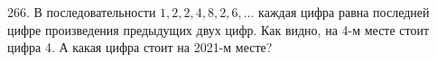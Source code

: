 266. В последовательности $1, 2, 2, 4, 8, 2, 6, \ldots$ каждая цифра равна последней цифре произведения предыдущих двух цифр. Как видно, на 4-м месте стоит цифра 4. А какая цифра стоит на 2021-м месте?\\
